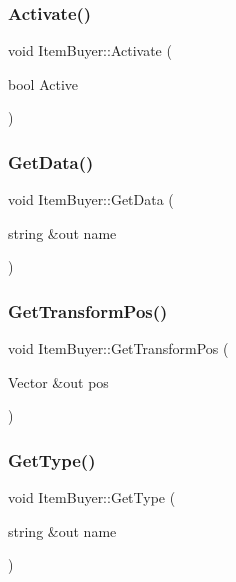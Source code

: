 \subsubsection{\texorpdfstring{Activate()}{Activate()}}
{\footnotesize\ttfamily void Item\+Buyer\+::\+Activate (\begin{DoxyParamCaption}\item[{bool}]{Active }\end{DoxyParamCaption})}

\hypertarget{class_item_buyer_a238ef01cd2cc59e841301aadd1437e29}{}\label{class_item_buyer_a238ef01cd2cc59e841301aadd1437e29} 
\subsubsection{\texorpdfstring{Get\+Data()}{GetData()}}
{\footnotesize\ttfamily void Item\+Buyer\+::\+Get\+Data (\begin{DoxyParamCaption}\item[{string \&out}]{name }\end{DoxyParamCaption})}

\hypertarget{class_item_buyer_aa642c313d7f7a00302345ef86e32b77d}{}\label{class_item_buyer_aa642c313d7f7a00302345ef86e32b77d} 
\subsubsection{\texorpdfstring{Get\+Transform\+Pos()}{GetTransformPos()}}
{\footnotesize\ttfamily void Item\+Buyer\+::\+Get\+Transform\+Pos (\begin{DoxyParamCaption}\item[{Vector \&out}]{pos }\end{DoxyParamCaption})}

\hypertarget{class_item_buyer_aa224607cfd2d9726eeb03a819cd4ff5b}{}\label{class_item_buyer_aa224607cfd2d9726eeb03a819cd4ff5b} 
\subsubsection{\texorpdfstring{Get\+Type()}{GetType()}}
{\footnotesize\ttfamily void Item\+Buyer\+::\+Get\+Type (\begin{DoxyParamCaption}\item[{string \&out}]{name }\end{DoxyParamCaption})}

